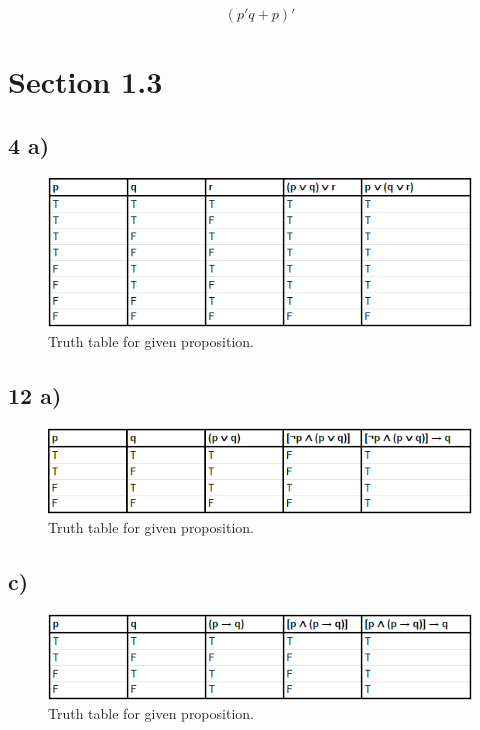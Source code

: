 \documentclass[journal]{IEEEtran}
\begin{document}
		$$\boxed{(p'q+p)'}$$

\section*{Section 1.3}
\subsection*{4 a) }

		\begin{figure}[H]
			\includegraphics[scale = 0.55]{4A.PNG}
			\caption{Truth table for given proposition.}
		\end{figure}

		\subsection*{12 a) }

		\begin{figure}[H]
			\includegraphics[scale = 0.55]{12A.PNG}
			\caption{Truth table for given proposition.}
		\end{figure}

	\subsection*{c) }

		\begin{figure}[h!]
			\includegraphics[scale = 0.55]{12C.PNG}
			\caption{Truth table for given proposition.}
		\end{figure}
\end{document}
